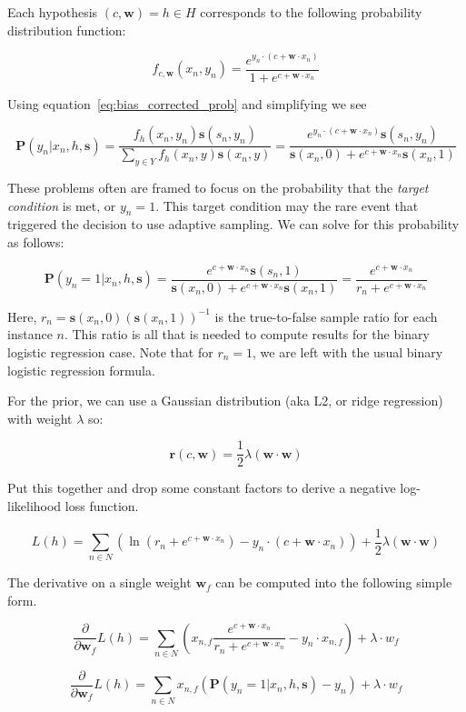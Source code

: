\documentclass[twoside]{article}
\begin{document}
Each hypothesis \((c, \mathbf{w})=h \in H\) corresponds to the following probability distribution function:

\[f_{c,\mathbf{w}}(x_n, y_n)=\frac{e^{y_n \cdot (c+\mathbf{w} \cdot x_n)}}{1+e^{c+\mathbf{w} \cdot x_n}}\]

Using  equation~\eqref{eq:bias_corrected_prob} and simplifying we see

\[\mathbf{P}(y_n|x_n,h,\mathbf{s})=\frac{f_h(x_n,y_n)\mathbf{s}(s_n,y_n)}{\sum_{y \in Y}f_h(x_n,y)\mathbf{s}(x_n,y)}=\frac{e^{y_n \cdot (c+\mathbf{w} \cdot x_n)}\mathbf{s}(s_n,y_n)}{\mathbf{s}(x_n,0)+e^{c+\mathbf{w} \cdot x_n}\mathbf{s}(x_n,1)} \]

These problems often are framed to focus on the probability that the \textit{target condition} is met, or \(y_n = 1\). This target condition may the rare event that triggered the decision to use adaptive sampling. We can solve for this probability as follows:

\[\mathbf{P}(y_n=1|x_n,h,\mathbf{s})=\frac{e^{c+\mathbf{w} \cdot x_n}\mathbf{s}(s_n,1)}{\mathbf{s}(x_n,0)+e^{c+\mathbf{w} \cdot x_n}\mathbf{s}(x_n,1)}=\frac{e^{c+\mathbf{w} \cdot x_n}}{r_n+e^{c+\mathbf{w} \cdot x_n}} \]

Here, \(r_n = \mathbf{s}(x_n,0)(\mathbf{s}(x_n,1))^{-1}\) is the true-to-false sample ratio for each instance \(n\). This ratio is all that is needed to compute results for the binary logistic regression case. Note that for \(r_n=1\), we are left with the usual binary logistic regression formula.

For the prior, we can use a Gaussian distribution (aka L2, or ridge regression) with weight \(\lambda\) so:

\[\mathbf{r}(c,\mathbf{w})=\frac{1}{2}\lambda(\mathbf{w} \cdot \mathbf{w})\]

Put this together and drop some constant factors to derive a negative log-likelihood loss function.

\[L(h)=\sum_{n \in  N} \left (\ln\left (r_n+e^{c+\mathbf{w} \cdot x_n}\right ) -y_n \cdot (c+\mathbf{w} \cdot x_n) \right )+ \frac{1}{2}\lambda(\mathbf{w} \cdot \mathbf{w})\]

The derivative on a single weight \(\mathbf{w}_f\) can be computed into the following simple form.

\[\frac{\partial}{\partial \mathbf{w}_f }L(h)=\sum_{n \in  N} \left(x_{n,f}\frac{e^{c+\mathbf{w} \cdot x_n}}{r_n+e^{c+\mathbf{w} \cdot x_n}} -y_n \cdot x_{n,f} \right )+ \lambda \cdot w_f\] 

\[\frac{\partial}{\partial \mathbf{w}_f }L(h)= \sum_{n \in  N} x_{n,f}\left(\mathbf{P}(y_n=1|x_n,h,\mathbf{s}) -y_n  \right )+ \lambda \cdot w_f \]
\end{document}
